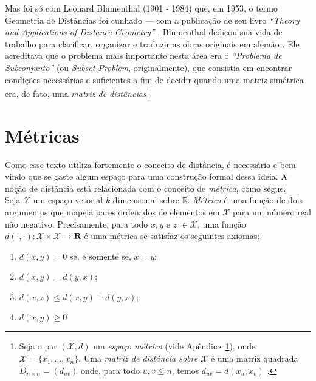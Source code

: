\documentclass[a4paper,12pt]{article}
\begin{document}
Mas foi só com Leonard Blumenthal (1901 - 1984) que, em 1953, o termo Geometria de Distâncias foi cunhado --- com a publicação de seu livro \textit{``Theory and Applications of Distance Geometry''} \cite{Blumenthal:53}.
Blumenthal dedicou sua vida de trabalho para clarificar, organizar e traduzir as obras originais em alemão \cite{libertiEDG}. Ele acreditava que o problema mais importante nesta área era o \textit{``Problema de Subconjunto''} (ou \textit{Subset Problem}, originalmente), que consistia em encontrar condições necessárias e suficientes a fim de decidir quando uma matriz simétrica era, de fato, uma \textit{matriz de distâncias}\footnote{Seja o par $(\mathcal{X}, d)$ um \textit{espaço métrico} (vide Apêndice~\ref{ap:metric}), onde $\mathcal{X} = \{x_1, \dots, x_n\}$. Uma \textit{matriz de distância sobre $\mathcal{X}$} é uma matriz quadrada $D_{n\times n} = (d_{uv})$ onde, para todo $u,v \leq n$, temos $d_{uv} = d(x_u,x_v)$ \cite{carlileGDandAplications}.}


\newpage
{}
{}




\appendix
\newpage
\section{Métricas}
\label{ap:metric}

Como esse texto utiliza fortemente o conceito de distância, é necessário e bem vindo que se gaste algum espaço para uma construção formal dessa ideia. A noção de distância está relacionada com o conceito de \textit{métrica}, como segue.
\\

Seja $\mathcal{X}$ um espaço vetorial $k$-dimensional sobre $\mathbb{R}$. \textit{Métrica} é uma função de dois argumentos que mapeia pares ordenados de elementos em $\mathcal{X}$ para um número real não negativo. Precisamente, para todo $x, y$ e $z$ $\in \mathcal{X}$, uma função $d(\cdot,\cdot): \mathcal{X} \times \mathcal{X} \longrightarrow \mathbf{R}$ é uma métrica se satisfaz os seguintes axiomas:

\begin{enumerate}
	\item $d(x,y) = 0$ se, e somente se, $x = y$; 
	\item $d(x,y) = d(y,x)$;
	\item $d(x,z) \leq d(x,y) + d(y,z)$;
	\item $d(x,y) \geq 0$
\end{enumerate}
\end{document}

